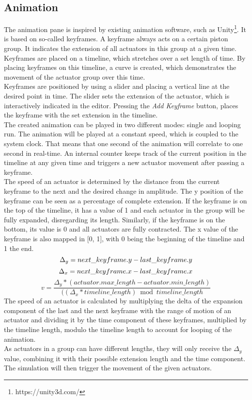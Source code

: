 \subsection{Animation}
The animation pane is inspired by existing animation software, such as Unity\footnote{https://unity3d.com/}. It is based on so-called keyframes. A keyframe always acts on a certain piston group. It indicates the extension of all actuators in this group at a given time. Keyframes are placed on a timeline, which stretches over a set length of time. By placing keyframes on this timeline, a curve is created, which demonstrates the movement of the actuator group over this time.\\
Keyframes are positioned by using a slider and placing a vertical line at the desired point in time. The slider sets the extension of the actuator, which is interactively indicated in the editor. Pressing the \textit{Add Keyframe} button, places the keyframe with the set extension in the timeline.\\
The created animation can be played in two different modes: single and looping run. The animation will be played at a constant speed, which is coupled to the system clock. That means that one second of the animation will correlate to one second in real-time. An internal counter keeps track of the current position in the timeline at any given time and triggers a new actuator movement after passing a keyframe.\\
The speed of an actuator is determined by the distance from the current keyframe to the next and the desired change in amplitude. The y position of the keyframe can be seen as a percentage of complete extension. If the keyframe is on the top of the timeline, it has a value of 1 and each actuator in the group will be fully expanded, disregarding its length. Similarly, if the keyframe is on the bottom, its value is 0 and all actuators are fully contracted. The x value of the keyframe is also mapped in [0, 1], with 0 being the beginning of the timeline and 1 the end.
\begin{equation}
  \Delta_y = next\_keyframe.y - last\_keyframe.y\\
\end{equation}
\begin{equation}
  \Delta_x = next\_keyframe.x - last\_keyframe.x\\
\end{equation}
\begin{equation}
  v = \frac{\Delta_y * (actuator.max\_length - actuator.min\_length)}{((\Delta_x * timeline\_length) \bmod timeline\_length}
\end{equation}
The speed of an actuator is calculated by multiplying the delta of the expansion component of the last and the next keyframe with the range of motion of an actuator and dividing it by the time component of these keyframes, multiplied by the timeline length, modulo the timeline length to account for looping of the animation.\\
As actuators in a group can have different lengths, they will only receive the $\Delta_y$ value, combining it with their possible extension length and the time component. The simulation will then trigger the movement of the given actuators.

